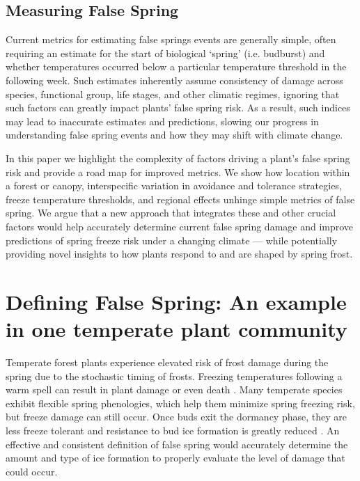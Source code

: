 \documentclass{article}\usepackage[]{graphicx}\usepackage[]{color}
\begin{document}
\subsection*{Measuring False Spring}
Current metrics for estimating false springs events are generally simple, often requiring an estimate for the start of biological `spring' (i.e. budburst) and whether temperatures occurred below a particular temperature threshold in the following week. Such estimates inherently assume consistency of damage across species, functional group, life stages, and other climatic regimes, ignoring that such factors can greatly impact plants' false spring risk. As a result, such indices may lead to inaccurate estimates and predictions, slowing our progress in understanding false spring events and how they may shift with climate change. 

In this paper we highlight the complexity of factors driving a plant's false spring risk and provide a road map for improved metrics. We show how location within a forest or canopy, interspecific variation in avoidance and tolerance strategies, freeze temperature thresholds, and regional effects unhinge simple metrics of false spring. We argue that a new approach that integrates these and other crucial factors would help accurately determine current false spring damage and improve predictions of spring freeze risk under a changing climate --- while potentially providing novel insights to how plants respond to and are shaped by spring frost. %

\section*{Defining False Spring: An example in one temperate plant community}
Temperate forest plants experience elevated risk of frost damage during the spring due to the stochastic timing of frosts. Freezing temperatures following a warm spell can result in plant damage or even death \citep{Ludlum1968, Mock2007}. Many temperate species exhibit flexible spring phenologies, which help them minimize spring freezing risk, but freeze damage can still occur. Once buds exit the dormancy phase, they are less freeze tolerant and resistance to bud ice formation is greatly reduced \citep{Taschler2004, Lenz2013, Vitasse2014a}. %
An effective and consistent definition of false spring would accurately determine the amount and type of ice formation to properly evaluate the level of damage that could occur.
 
\end{document}
